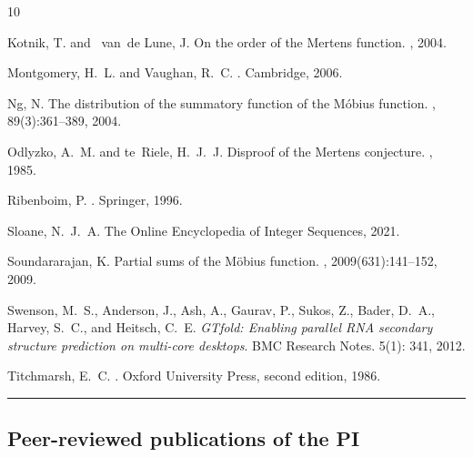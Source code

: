 \documentclass[10pt,reqno,letterpaper]{article}
\theoremstyle{plain}
\numberwithin{theorem}{section}
\theoremstyle{definition}
\newcounter{completeBibitemIncrementCtr}
\renewenvironment{thebibliography}[1]{
     \renewcommand{\refname}{} 
     
     \begin{oldthebibliography}{#1}
     \setlength{\itemsep}{-0.6mm}
     \setlength{\parskip}{0em}
     \setlength{\topsep}{0pt}
     \setlength{\partopsep}{0pt}
     \setcounter{enumiv}{\value{completeBibitemIncrementCtr}}
     \normalsize%
}
{
     \setcounter{completeBibitemIncrementCtr}{\value{enumiv}}
     \end{oldthebibliography}
}
\begin{document}
\begin{thebibliography}{10}
Kotnik, T. and ~van~de Lune, J.
\newblock On the order of the {M}ertens function.
, 2004.

Montgomery, H.~L. and Vaughan, R.~C.
.
\newblock Cambridge, 2006.

Ng, N.
\newblock The distribution of the summatory function of the {M}{\'{o}}bius
  function.
, 89(3):361--389, 2004.

Odlyzko, A.~M. and te~Riele, H.~J.~J. 
\newblock Disproof of the {M}ertens conjecture.
, 1985.

Ribenboim, P.
.
\newblock Springer, 1996.

Sloane, N.~J.~A.
\newblock The {O}nline {E}ncyclopedia of {I}nteger {S}equences, 2021.

Soundararajan, K.
\newblock Partial sums of the {M}{\"{o}}bius function.
, 2009(631):141--152, 2009.

Swenson, M.~S., Anderson, J., Ash, A., Gaurav, P., Sukos, Z., Bader, D.~A., 
Harvey, S.~C., and Heitsch, C.~E. 
\emph{GTfold: Enabling parallel RNA secondary structure prediction on multi-core desktops}. 
BMC Research Notes. 5(1): 341, 2012. 

Titchmarsh, E.~C.
.
\newblock Oxford University Press, second edition, 1986.

\end{thebibliography}

\vskip -1.5mm
\hrule\medskip
\subsection{Peer-reviewed publications of the PI} 
\label{page_BibliographyB_subSection_MDSPubs} 
\end{document}
